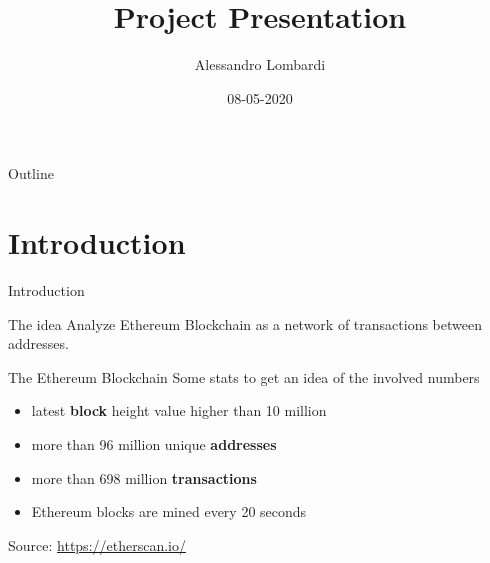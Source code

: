 \documentclass{beamer}
\title[Project Presentation]{Project Presentation}
\author{Alessandro Lombardi}
\institute{Artificial Intelligence - University of Bologna}
\date{08-05-2020}
\begin{document}
    \begin{frame}
        \titlepage
    \end{frame}

    \begin{frame}{Outline}
        \tableofcontents
    \end{frame}

    \section{Introduction}\label{sec:introduction}

    \begin{frame}{Introduction}
        \begin{block}{The idea}
            Analyze Ethereum Blockchain as a network of transactions between addresses.
        \end{block}

        \vskip 1cm

        \begin{block}{The Ethereum Blockchain}
            Some stats to get an idea of the involved numbers
            \begin{itemize}
                \item latest \textbf{block} height value higher than 10 million
                \item more than 96 million unique \textbf{addresses}
                \item more than 698 million \textbf{transactions}
                \item Ethereum blocks are mined every 20 seconds
            \end{itemize}
            Source: \url{https://etherscan.io/}
        \end{block}

    \end{frame}
\end{document}
